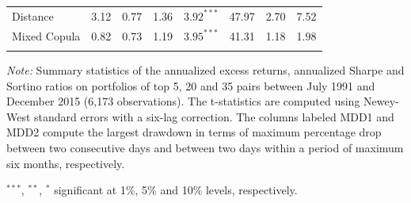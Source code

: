 \documentclass[pdf,9pt,xcolor=dvipsnames,hide notes]{beamer}
\begin{document}
\begin{frame}
\begin{threeparttable}[H]
\begin{tabularx}{\textwidth}{@{\extracolsep{\fill}}llllllll@{}}
				Distance & \cellcolor{celadon} 3.12  & \cellcolor{celadon} 0.77  & 1.36  & $3.92^{***}$  & 47.97 & 2.70  & 7.52 \\
				Mixed Copula & 0.82  & 0.73  & 1.19  & $3.95^{***}$  & 41.31 & \cellcolor{corn} 1.18  & \cellcolor{corn} 1.98  \\
				\multicolumn{1}{r}{} & \multicolumn{1}{r}{} & \multicolumn{1}{r}{} & \multicolumn{1}{r}{} & \multicolumn{1}{r}{} & \multicolumn{1}{r}{} & \multicolumn{1}{r}{} & \multicolumn{1}{r}{} \\
				\bottomrule
			\end{tabularx}%
			\begin{tablenotes}
				\item \textit{Note:} \scriptsize \tiny Summary statistics of the annualized excess returns, annualized Sharpe and Sortino ratios on portfolios of top 5, 20 and 35 pairs between July 1991 and December 2015 (6,173 observations). The t-statistics are computed using Newey-West standard errors with a six-lag correction. The columns labeled MDD1 and MDD2 compute the largest drawdown in terms of maximum percentage drop between two consecutive days and between two days within a period of maximum six months, respectively.
				\item \scriptsize $^{\ast\ast\ast}$, $^{\ast\ast}$, $^{\ast}$  significant at 1\%, 5\% and 10\% levels, respectively.
			\end{tablenotes}
			\label{tab:table101}%
		\end{threeparttable}%

	\end{frame}
\end{document}
